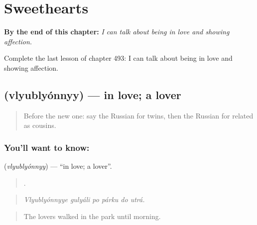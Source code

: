 
\chapter{Sweethearts}
\label{ch:ru-sweethearts}

\begin{chapteropening}
\textbf{By the end of this chapter:} \emph{I can talk about being in love and showing affection.}

Complete the last lesson of chapter 493: I can talk about being in love and showing affection.
\end{chapteropening}

\section[\texorpdfstring{\ru{влюблённый} (vlyublyónnyy)}{влюблённый (vlyublyónnyy)}]{ (vlyublyónnyy) — in love; a lover}

\label{lesson:RU-C493-vlyublyonnyy}



\begin{quote}
Before the new one: say the Russian for twins, then the Russian for related as cousins.
\end{quote}

\subsection*{You'll want to know: }
\textbf{} (\emph{vlyublyónnyy}) — \textquotedblleft{}in love; a lover\textquotedblright{}.

\begin{quote}
     .
\end{quote}

\begin{quote}
\emph{Vlyublyónnyye gulyáli po párku do utrá.}
\end{quote}

\begin{quote}
The lovers walked in the park until morning.
\end{quote}

